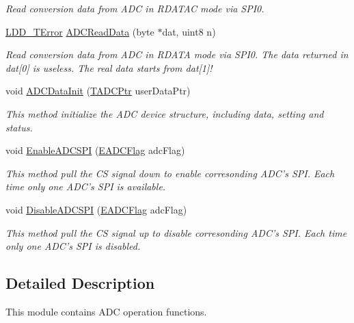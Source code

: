 \begin{DoxyCompactItemize}
\begin{DoxyCompactList}\small\item\em Read conversion data from A\-D\-C in R\-D\-A\-T\-A\-C mode via S\-P\-I0. \end{DoxyCompactList}\item 
\hyperlink{group___p_e___types__module_ga24c2b045fd04e79e85f261ce4df35588}{L\-D\-D\-\_\-\-T\-Error} \hyperlink{group___a_d_c__module_gac52d9692bf2114d7a9d22042099d087b}{A\-D\-C\-Read\-Data} (byte $\ast$dat, uint8 n)
\begin{DoxyCompactList}\small\item\em Read conversion data from A\-D\-C in R\-D\-A\-T\-A mode via S\-P\-I0. The data returned in dat\mbox{[}0\mbox{]} is useless. The real data starts from dat\mbox{[}1\mbox{]}! \end{DoxyCompactList}\item 
void \hyperlink{group___a_d_c__module_gad964ca16935d2f9704e1e047861072ea}{A\-D\-C\-Data\-Init} (\hyperlink{struct_t_a_d_c}{T\-A\-D\-C\-Ptr} user\-Data\-Ptr)
\begin{DoxyCompactList}\small\item\em This method initialize the A\-D\-C device structure, including data, setting and status. \end{DoxyCompactList}\item 
void \hyperlink{group___a_d_c__module_ga6d15fbab721231334a4ea44c8df9d3f5}{Enable\-A\-D\-C\-S\-P\-I} (\hyperlink{group___enum_grp_ga7a77f876c6fae36cb97dfc3ba1e07665}{E\-A\-D\-C\-Flag} adc\-Flag)
\begin{DoxyCompactList}\small\item\em This method pull the C\-S signal down to enable corresonding A\-D\-C's S\-P\-I. Each time only one A\-D\-C's S\-P\-I is available. \end{DoxyCompactList}\item 
void \hyperlink{group___a_d_c__module_gaaff16de9519f1d376e1103692d7dd44d}{Disable\-A\-D\-C\-S\-P\-I} (\hyperlink{group___enum_grp_ga7a77f876c6fae36cb97dfc3ba1e07665}{E\-A\-D\-C\-Flag} adc\-Flag)
\begin{DoxyCompactList}\small\item\em This method pull the C\-S signal up to disable corresonding A\-D\-C's S\-P\-I. Each time only one A\-D\-C's S\-P\-I is disabled. \end{DoxyCompactList}\end{DoxyCompactItemize}


\subsection{Detailed Description}
This module contains A\-D\-C operation functions. 

